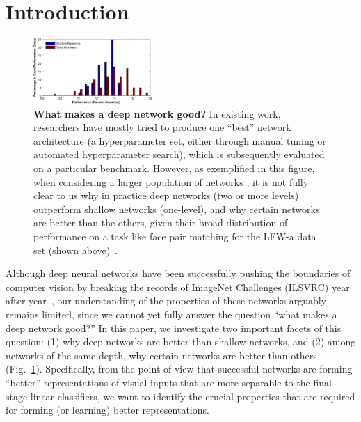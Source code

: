 \documentclass[10pt,twocolumn,letterpaper]{article}
\begin{document}
\section{Introduction}

\begin{figure}
\begin{center}
\includegraphics[width=0.40\textwidth]{Figs/e_fig7s_compact-crop.pdf} 
\end{center}
\caption{{\bf What makes a deep network good?}
In existing work, researchers have mostly tried to produce one ``best'' network architecture (\ie a hyperparameter set, either through manual tuning or automated hyperparameter search), which is subsequently evaluated on a particular benchmark. However, as exemplified in this figure, when considering a larger population of networks \cite{cox2011beyond}, it is not fully clear to us why in practice deep networks (\eg two or more levels) outperform shallow networks (\eg one-level), and why certain networks are better than the others, given their broad distribution of performance on a task like face pair matching for the LFW-a data set (shown above)~\cite{LFWTech, wolf2011effective}.
} %
\label{fig:perf}
\end{figure}

Although deep neural networks have been successfully pushing the boundaries of computer vision by breaking the records of ImageNet Challenges (ILSVRC) year after year~\cite{krizhevsky2012imagenet, sermanet2013overfeat, szegedy2014going}, our understanding of the properties of these networks arguably remains limited, since we cannot yet fully answer the question ``what makes a deep network good?'' In this paper, we investigate two important facets of this question: (1) why deep networks are better than shallow networks, and (2) among networks of the same depth, why certain networks are better than others (Fig.~\ref{fig:perf}). Specifically, from the point of view that successful networks are forming ``better'' representations of visual inputs that are more separable to the final-stage linear classifiers, we want to identify the crucial properties that are required for forming (or learning) better representations.
\end{document}
